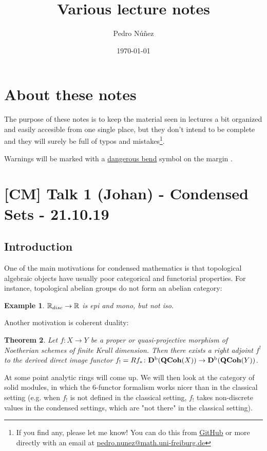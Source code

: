 \documentclass[A4paper, british]{amsart}
\author{Pedro Núñez}
\title[Various lecture notes]{Various lecture notes}
\date{\today}
\theoremstyle{darkgreentheorem}
\newtheorem{thm}{Theorem}[section]
\theoremstyle{darkbluedefinition}
\theoremstyle{darkredexample}
\newtheorem{exa}[thm]{Example}
\theoremstyle{remark}
\newcommand{\1}{\mathbbm{1}}
\newcommand{\db}{\marginnote{\dbend}}
\begin{document}
\maketitle

\tableofcontents

\section{About these notes}

The purpose of these notes is to keep the material seen in lectures a bit organized and easily accesible from one single place, but they don't intend to be complete and they will surely be full of typos and mistakes\footnote{If you find any, please let me know! You can do this from \href{https://github.com/pedro-nlb/notes}{GitHub} or more directly with an email at \href{mailto:pedro.nunez@math.uni-freiburg.de}{pedro.nunez@math.uni-freiburg.de}}.

Warnings will be marked with a \href{https://en.wikipedia.org/wiki/Bourbaki_dangerous_bend_symbol}{dangerous bend} symbol on the margin \db.

\section{[CM] Talk 1 (Johan) - Condensed Sets - 21.10.19}

\subsection{Introduction}

One of the main motivations for condensed mathematics is that topological algebraic objects have usually poor categorical and functorial properties.
For instance, topological abelian groups do not form an abelian category:

\begin{exa}
    $\mathbb{R}_{disc}\to \mathbb{R}$ is epi and mono, but not iso.
\end{exa}

Another motivation is coherent duality:

\begin{thm}
    Let $f\colon X\to Y$ be a proper or quasi-projective morphism of Noetherian schemes of finite Krull dimension. Then there exists a right adjoint $f^{!}$ to the derived direct image functor $f_{!}=Rf_{*}\colon \mathbf{D}^{\mathrm{b}}(\mathbf{QCoh}(X))\to \mathbf{D}^{\mathrm{b}}(\mathbf{QCoh}(Y))$.
\end{thm}

At some point analytic rings will come up.
We will then look at the category of solid modules, in which the 6-functor formalism works nicer than in the classical setting (e.g. when $f_{!}$ is not defined in the classical setting, $f_{!}$ takes non-discrete values in the condensed settings, which are "not there" in the classical setting).
\end{document}
